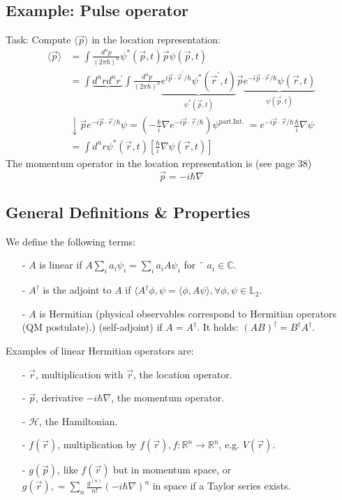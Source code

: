 \subsection{Example: Pulse operator}
Task: Compute $\langle\vec{p}\rangle$ in the location representation:
\begin{equation}
\begin{aligned}\langle\vec{p}\rangle &=\int \frac{d^{n} p}{(2 \pi \hbar)^{n}} \psi^{*}(\vec{p}, t) \vec{p} \psi(\vec{p}, t) \\ &=\int \underbrace{d^{n} r d^{n} r^{\prime}} \int \frac{d^{n} p}{(2 \pi \hbar)^{n}} \underbrace{e^{i \vec{p} \cdot \vec{r}^{\prime} / \hbar} \psi^{*}\left(\vec{r}^{\prime}, t\right)}_{\psi^{*}(\vec{p}, t)} \vec{p} \underbrace{e^{-i \vec{p} \cdot \vec{r} / \hbar} \psi(\vec{r}, t)}_{\psi(\vec{p}, t)} \\ & \downarrow \vec{p} e^{-i \vec{p} \cdot \vec{r} / \hbar} \psi=\left(-\frac{\hbar}{i} \nabla e^{-i \vec{p} \cdot \vec{r} / \hbar}\right) \psi^{\text {part.Int. }}= e^{-i \vec{p} \cdot \vec{r} / \hbar} \frac{\hbar}{i} \nabla \psi \\ &=\int d^{n} r \psi^{*}(\vec{r}, t)\left[\frac{\hbar}{i} \nabla \psi(\vec{r}, t)\right] \end{aligned}
\end{equation}
The momentum operator in the location representation is (see page 38)
\begin{equation}
    \vec{p}=-i\hbar\nabla
\end{equation}
\subsection{General Definitions \& Properties}
We define the following terms:
\begin{enumerate}
    \item[-] $A$ is linear if          $A\sum_ia_i\psi_i=\sum_ia_iA\psi_i$ for ¨ $a_i \in \mathbb{C}$.
    \item[-] $A^{\dagger}$ is the adjoint to $A$ if $\langle A^{\dagger}\phi,\psi=\langle\phi,A\psi\rangle,\forall\phi,\psi\in\mathbb{L}_2$.
    \item[-] $A$ is Hermitian (physical observables correspond to Hermitian operators (QM postulate).) (self-adjoint) if $A=A^{\dagger}$. It holds: $(AB)^{\dagger}=B^{\dagger}A^{\dagger}$.
\end{enumerate}
Examples of linear Hermitian operators are:
\begin{enumerate}
    \item[-] $\vec{r}$, multiplication with $\vec{r}$, the location operator.
    \item[-] $\vec{p}$, derivative $-i\hbar\nabla$, the momentum operator.
    \item[-] $\mathcal{H}$, the Hamiltonian.
    \item[-] $f(\vec{r})$, multiplication by $f(\vec{r}),f:\mathbb{R}^n\to\mathbb{R}^n$, e.g. $V(\vec{r})$.
    \item[-] $g(\vec{p})$, like $f(\vec{r})$ but in momentum space, or $g(\vec{r}),=\sum_n\frac{g^{(n)}}{n!}(-i\hbar\nabla)^n$ in space if a Taylor series exists.
\end{enumerate}

